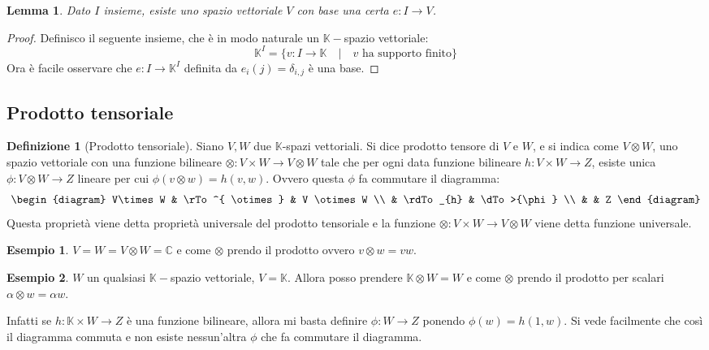 \documentclass[11pt]{article}
\theoremstyle{plain}
\newtheorem{lemma}[thm]{Lemma}
\theoremstyle{definition}
\newtheorem{defn}{Definizione}[section]
\newtheorem{exmp}{Esempio}[section]
\theoremstyle{remark}
\newcommand{\C}{\mathbb{C}}
\newcommand{\K}{\mathbb{K}}
\newcommand{\tridiag}[6]{
	  \begin{diagram}
	  #1 & \rTo^{#2}  & #3        \\
	     & \rdTo_{#6} & \dTo>{#4}   \\
	     &          & #5
	  \end{diagram}
}
\begin{document}
\begin{lemma}
Dato $I$ insieme, esiste uno spazio vettoriale $V$ con base una certa $e:I\to V$.
\end{lemma}
\begin{proof}
Definisco il seguente insieme, che è in modo naturale un $\K-$spazio vettoriale:
\[ \K^I = \{ v:I\to\K \quad|\quad v \text{ ha supporto finito}\}\]
Ora è facile osservare che $e:I\to\K^I$ definita da $e_i(j) = \delta_{i,j}$ è una base.
\end{proof}


\subsection{Prodotto tensoriale}

\begin{defn}[Prodotto tensoriale]
   Siano $V, W$ due $\K$-spazi vettoriali. Si dice prodotto tensore di $V$ e $W$,
   e si indica come $V\otimes W$, uno spazio vettoriale con una funzione bilineare
   $\otimes: V \times W \to V\otimes W$ tale che per ogni data funzione bilineare $h: V\times W \to  Z$,
   esiste unica $\phi: V\otimes W \to Z$ lineare per cui $\phi(v \otimes w)=h(v,w)$. Ovvero questa $\phi$ fa commutare il diagramma:
   \[\tridiag{V\times W}{ \otimes }{V \otimes W}{\phi}{Z}{h}\]
   Questa proprietà viene detta proprietà universale del prodotto tensoriale e la funzione $\otimes: V \times W \to V\otimes W$
   viene detta funzione universale.
\label{defn:prodotto tensoriale}
\end{defn}

\begin{exmp} $V=W=V\otimes W = \C$ e come $\otimes$ prendo il prodotto ovvero $v\otimes w=vw$.
\end{exmp}
\begin{exmp} $W$ un qualsiasi $\K-$spazio vettoriale, $V=\K$. Allora posso prendere $\K\otimes W = W$ e come $\otimes$ prendo il prodotto per scalari $\alpha\otimes w=\alpha w$.

Infatti se $h:\K\times W\to Z$ è una funzione bilineare, allora mi basta definire $\phi:W\to Z$ ponendo $\phi(w) = h(1, w)$. Si vede facilmente
che così il diagramma commuta e non esiste nessun'altra $\phi$ che fa commutare il diagramma.
\end{exmp}
\end{document}
